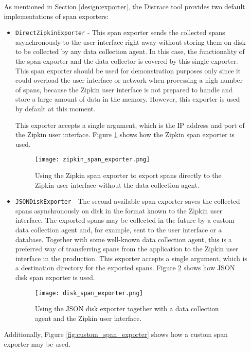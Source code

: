 As mentioned in Section \ref{design:exporter}, the Distrace tool provides two default implementations of span exporters:
\begin{itemize}
	\item  \texttt{DirectZipkinExporter} -  This span exporter sends the collected spans asynchronously to the user interface right away without storing them on disk to be collected by any data collection agent. In this case, the functionality of the span exporter and the data collector is covered by this single exporter. This span exporter should be used for demonstration purposes only since it could overload the user interface or network when processing a high number of spans, because the Zipkin user interface is not prepared to handle and store a large amount of data in the memory. However, this exporter is used by default at this moment.
	
	This exporter accepts a single argument, which is the IP address and port of the Zipkin user interface. Figure \ref{fig:zipkin_span_exporter} shows how the Zipkin span exporter is used.
	
	\begin{figure}
		\centering
		\texttt{[image: zipkin\_span\_exporter.png]}
		\caption{Using the Zipkin span exporter to export spans directly to the Zipkin user interface without the data collection agent.}
		\label{fig:zipkin_span_exporter}
	\end{figure}
	\item  \texttt{JSONDiskExporter} - The second available span exporter saves the collected spans asynchronously on disk in the format known to the Zipkin user interface. The exported spans may be collected in the future by a custom data collection agent and, for example, sent to the user interface or a database. Together with some well-known data collection agent, this is a preferred way of transferring spans from the application to the Zipkin user interface in the production. This exporter accepts a single argument, which is a destination directory for the exported spans. Figure \ref{fig:disk_span_exporter} shows how JSON disk span exporter is used.
	\begin{figure}
		\centering
		\texttt{[image: disk\_span\_exporter.png]}
		\caption{Using the JSON disk exporter together with a data collection agent and the Zipkin user interface.}
		\label{fig:disk_span_exporter}
	\end{figure}
\end{itemize}
Additionally, Figure \ref{fig:custom_span_exporter} shows how a custom span exporter may be used.

